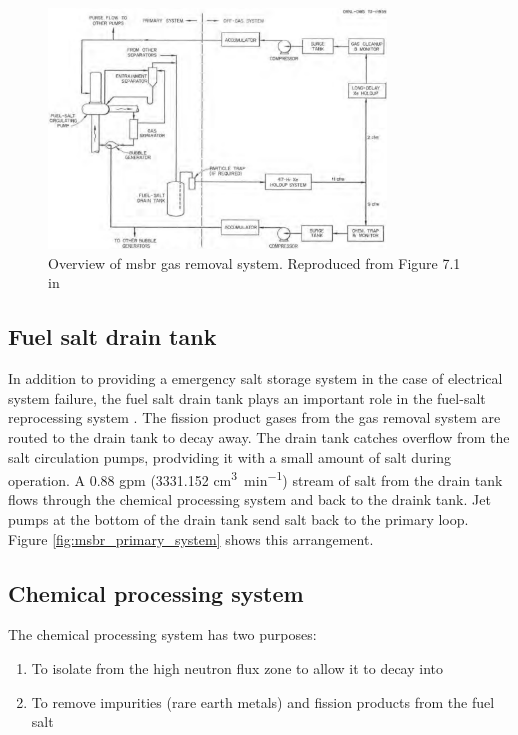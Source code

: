 \begin{figure}[htpb]
    \centering
    \includegraphics[width=0.8\textwidth]{figs/ch4/gas_removal_system.png}
    \caption{Overview of \Gls{msbr} gas removal system. Reproduced from Figure 7.1 in \cite{robertson_conceptual_1971}}
    \label{fig:gas_removal_system}
\end{figure}

\subsection{Fuel salt drain tank}
In addition to providing a emergency salt storage system in the case of electrical system failure, the fuel salt drain tank plays an important role in the fuel-salt reprocessing system \cite{robertson_conceptual_1971}. The fission product gases from the gas removal system are routed to the drain tank to decay away. The drain tank catches overflow from the salt circulation pumps, prodviding it with a small amount of salt during operation. A 0.88 gpm (3331.152
\unit{\centi\metre\cubed\per\minute}) stream of salt from the drain tank flows through the chemical processing system and back to the draink tank. Jet pumps at the bottom of the drain tank send salt back to the primary loop. Figure \ref{fig:msbr_primary_system} shows this arrangement.

\subsection{Chemical processing system}
The chemical processing system has two purposes:
\begin{enumerate}
    \item To isolate  from the high neutron flux zone to allow it to decay into 
    \item To remove impurities (rare earth metals) and fission products from the fuel salt
\end{enumerate}

